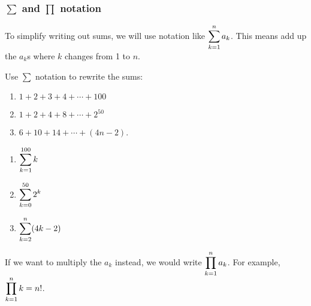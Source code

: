 \documentclass[12pt]{article}
\begin{document}
\subsubsection*{$\sum$ and $\prod$ notation}

To simplify writing out sums, we will use notation like $\displaystyle\sum_{k=1}^n a_k$.  This means add up the $a_k$s where $k$ changes from 1 to $n$.

\begin{example}
  Use $\sum$ notation to rewrite the sums:
  \begin{enumerate}
    \item $1 + 2 + 3 + 4 + \cdots + 100$
    \item $1 + 2 + 4 + 8 + \cdots + 2^{50}$
    \item $6 + 10 + 14 + \cdots + (4n - 2)$.
  \end{enumerate}
  \begin{solution}
  \begin{multicols}{3}
    \begin{enumerate}
      \item $\displaystyle\sum_{k=1}^{100} k$
      \item $\displaystyle\sum_{k=0}^{50} 2^k$
      \item $\displaystyle\sum_{k=2}^{n} (4k -2)$
    \end{enumerate}
    \end{multicols}
  \end{solution}
\end{example}


If we want to multiply the $a_k$ instead, we would write $\displaystyle\prod_{k=1}^n a_k$.  For example, $\displaystyle\prod_{k=1}^n k = n!$.
\end{document}
